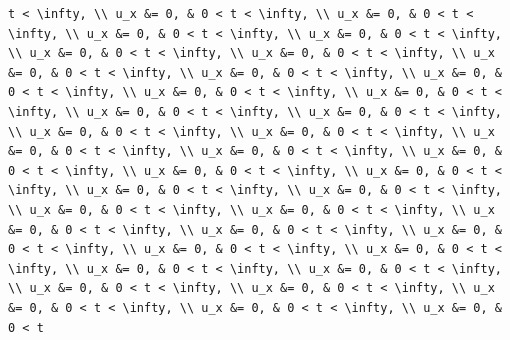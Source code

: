 \documentclass[
  ukrainian,
]{article}
\begin{document}
\begin{verbatim}
t < \infty, \\ u_x &= 0, & 0 < t < \infty, \\ u_x &= 0, & 0 < t < \infty, \\ u_x &= 0, & 0 < t < \infty, \\ u_x &= 0, & 0 < t < \infty, \\ u_x &= 0, & 0 < t < \infty, \\ u_x &= 0, & 0 < t < \infty, \\ u_x &= 0, & 0 < t < \infty, \\ u_x &= 0, & 0 < t < \infty, \\ u_x &= 0, & 0 < t < \infty, \\ u_x &= 0, & 0 < t < \infty, \\ u_x &= 0, & 0 < t < \infty, \\ u_x &= 0, & 0 < t < \infty, \\ u_x &= 0, & 0 < t < \infty, \\ u_x &= 0, & 0 < t < \infty, \\ u_x &= 0, & 0 < t < \infty, \\ u_x &= 0, & 0 < t < \infty, \\ u_x &= 0, & 0 < t < \infty, \\ u_x &= 0, & 0 < t < \infty, \\ u_x &= 0, & 0 < t < \infty, \\ u_x &= 0, & 0 < t < \infty, \\ u_x &= 0, & 0 < t < \infty, \\ u_x &= 0, & 0 < t < \infty, \\ u_x &= 0, & 0 < t < \infty, \\ u_x &= 0, & 0 < t < \infty, \\ u_x &= 0, & 0 < t < \infty, \\ u_x &= 0, & 0 < t < \infty, \\ u_x &= 0, & 0 < t < \infty, \\ u_x &= 0, & 0 < t < \infty, \\ u_x &= 0, & 0 < t < \infty, \\ u_x &= 0, & 0 < t < \infty, \\ u_x &= 0, & 0 < t < \infty, \\ u_x &= 0, & 0 < t < \infty, \\ u_x &= 0, & 0 < t < \infty, \\ u_x &= 0, & 0 < t < \infty, \\ u_x &= 0, & 0 < t < \infty, \\ u_x &= 0, & 0 < t
\end{verbatim}
\end{document}
